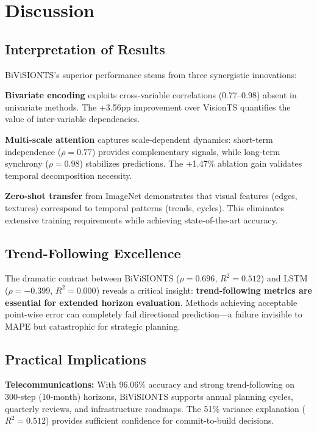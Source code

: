 \documentclass[preprint,12pt,authoryear]{elsarticle}
\begin{document}
\section{Discussion}
\label{sec:discussion}

\subsection{Interpretation of Results}

BiViSIONTS's superior performance stems from three synergistic innovations:

\textbf{Bivariate encoding} exploits cross-variable correlations (0.77--0.98) absent in univariate methods. The +3.56pp improvement over VisionTS quantifies the value of inter-variable dependencies.

\textbf{Multi-scale attention} captures scale-dependent dynamics: short-term independence ($\rho=0.77$) provides complementary signals, while long-term synchrony ($\rho=0.98$) stabilizes predictions. The +1.47\% ablation gain validates temporal decomposition necessity.

\textbf{Zero-shot transfer} from ImageNet demonstrates that visual features (edges, textures) correspond to temporal patterns (trends, cycles). This eliminates extensive training requirements while achieving state-of-the-art accuracy.

\subsection{Trend-Following Excellence}

The dramatic contrast between BiViSIONTS ($\rho=0.696$, $R^2=0.512$) and LSTM ($\rho=-0.399$, $R^2=0.000$) reveals a critical insight: \textbf{trend-following metrics are essential for extended horizon evaluation}. Methods achieving acceptable point-wise error can completely fail directional prediction—a failure invisible to MAPE but catastrophic for strategic planning.

\subsection{Practical Implications}

\textbf{Telecommunications:} With 96.06\% accuracy and strong trend-following on 300-step (10-month) horizons, BiViSIONTS supports annual planning cycles, quarterly reviews, and infrastructure roadmaps. The 51\% variance explanation ($R^2=0.512$) provides sufficient confidence for commit-to-build decisions.
\end{document}
